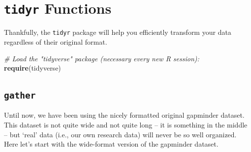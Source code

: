 \documentclass[
]{book}
\newenvironment{Shaded}{\begin{snugshade}}{\end{snugshade}}
\newcommand{\CommentTok}[1]{\textcolor[rgb]{0.56,0.35,0.01}{\textit{#1}}}
\newcommand{\KeywordTok}[1]{\textcolor[rgb]{0.13,0.29,0.53}{\textbf{#1}}}
\newcommand{\NormalTok}[1]{#1}
\begin{document}
\hypertarget{tidyr-functions}{%
\section{\texorpdfstring{\texttt{tidyr} Functions}{tidyr Functions}}\label{tidyr-functions}}

Thankfully, the \texttt{tidyr} package will help you efficiently transform your data regardless of their original format.

\begin{Shaded}
\begin{Highlighting}[]
\CommentTok{# Load the "tidyverse" package (necessary every new R session):}
\KeywordTok{require}\NormalTok{(tidyverse)}
\end{Highlighting}
\end{Shaded}

\hypertarget{gather}{%
\subsection{\texorpdfstring{\texttt{gather}}{gather}}\label{gather}}

Until now, we have been using the nicely formatted original gapminder dataset. This dataset is not quite wide and not quite long -- it is something in the middle -- but `real' data (i.e., our own research data) will never be so well organized. Here let's start with the wide-format version of the gapminder dataset.
\end{document}
